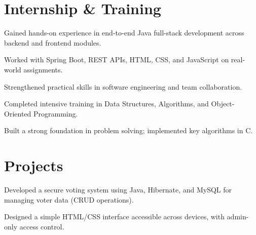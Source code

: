 \documentclass[]{deedy-resume-openfont}
\begin{document}
\hfill
\begin{minipage}[t]{0.66\textwidth} 


\section{Internship \& Training}
\vspace{\topsep} %
\begin{tightemize}
\item Gained hands-on experience in end-to-end Java full-stack development across backend and frontend modules.
\item Worked with Spring Boot, REST APIs, HTML, CSS, and JavaScript on real-world assignments.
\item Strengthened practical skills in software engineering and team collaboration.
\end{tightemize}  
\sectionsep

\begin{tightemize}
  \item Completed intensive training in Data Structures, Algorithms, and Object-Oriented Programming.
  \item Built a strong foundation in problem solving; implemented key algorithms in C.
\end{tightemize}
\sectionsep

\section{Projects}
\begin{tightemize}
  \item Developed a secure voting system using Java, Hibernate, and MySQL for managing voter data (CRUD operations).
  \item Designed a simple HTML/CSS interface accessible across devices, with admin-only access control.
\end{tightemize}


\end{minipage}
\end{document}
